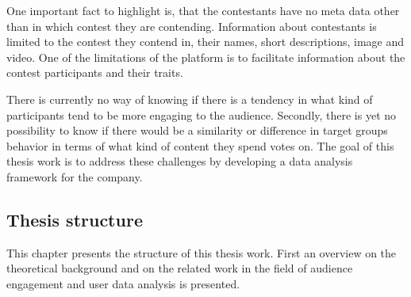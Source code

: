     One important fact to highlight is, that the contestants have no meta data other than in which contest they are contending. Information about contestants is limited to the contest they contend in, their names, short descriptions, image and video. One of the limitations of the platform is to facilitate information about the contest participants and their traits. 
    
    There is currently no way of knowing if there is a tendency in what kind of participants tend to be more engaging to the audience. Secondly, there is yet no possibility to know if there would be a similarity or difference in target groups behavior in terms of what kind of content they spend votes on. The goal of this thesis work is to address these challenges by developing a data analysis framework for the company.

\subsection{Thesis structure}
    This chapter presents the structure of this thesis work. First an overview on the theoretical background and on the related work in the field of audience engagement and user data analysis is presented. %